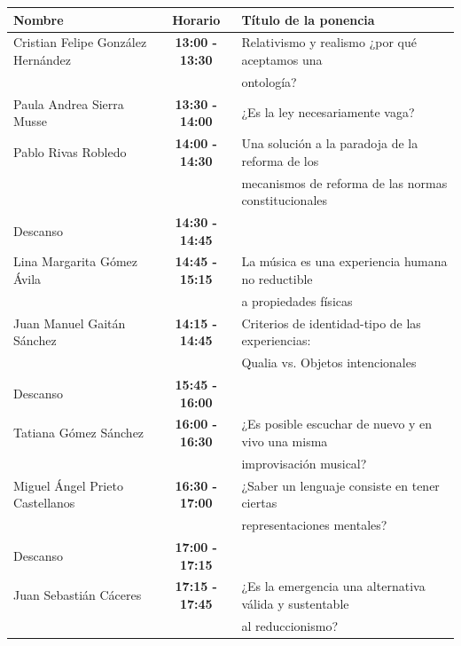 \documentclass[]{book}
\begin{document}
\begin{table}[]
	\centering
	\begin{tabular}{@{}lcl@{}}
		\toprule
		\textbf{Nombre}                    & \textbf{Horario}        & \textbf{Título de la ponencia} \\ \midrule
		Cristian Felipe González Hernández & \textbf{13:00 - 13:30}  & Relativismo y realismo ¿por qué aceptamos una \\ & &  ontología?                                             \\
		Paula Andrea Sierra Musse          & \textbf{13:30 - 14:00}  & ¿Es la ley necesariamente vaga?                                                                      \\
		Pablo Rivas Robledo                & \textbf{14:00 -  14:30} & Una solución a la paradoja de la reforma de los  \\ & &   mecanismos de reforma de las normas constitucionales \\
		Descanso                           & \textbf{14:30 - 14:45}  &                                                                                                      \\
		Lina Margarita Gómez Ávila         & \textbf{14:45 - 15:15}  & La música es una experiencia humana no reductible  \\ & &  a propiedades físicas                              \\
		Juan Manuel Gaitán Sánchez         & \textbf{14:15 - 14:45}  & Criterios de identidad-tipo de las experiencias:  \\ & &  Qualia vs. Objetos intencionales                    \\
		Descanso                           & \textbf{15:45 - 16:00}  &                                                                                                      \\
		Tatiana Gómez Sánchez              & \textbf{16:00 -  16:30} & ¿Es posible escuchar de nuevo y en vivo una misma \\ & & improvisación musical?                             \\
		Miguel Ángel Prieto Castellanos    & \textbf{16:30 - 17:00}  & ¿Saber un lenguaje consiste en tener ciertas  \\ & &  representaciones mentales?                              \\
		Descanso                           & \textbf{17:00 - 17:15}  &                                                                                                      \\
		Juan Sebastián Cáceres             & \textbf{17:15 - 17:45}  & ¿Es la emergencia una alternativa válida y sustentable  \\ & &  al reduccionismo?                             \\ \bottomrule
	\end{tabular}
\end{table}
\end{document}
